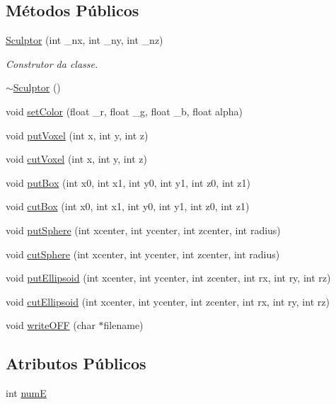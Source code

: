 \subsection*{Métodos Públicos}
\begin{DoxyCompactItemize}
\item 
\hyperlink{classSculptor_a014e3ef5517bf0e9d9e14486b6ac6433}{Sculptor} (int \+\_\+nx, int \+\_\+ny, int \+\_\+nz)
\begin{DoxyCompactList}\small\item\em Construtor da classe. \end{DoxyCompactList}\item 
\hyperlink{classSculptor_a8f159bf97458326f16d2e238e11be7ff}{$\sim$\+Sculptor} ()
\item 
void \hyperlink{classSculptor_a4e53f85ee03b729efafa985f72563c4b}{set\+Color} (float \+\_\+r, float \+\_\+g, float \+\_\+b, float alpha)
\item 
void \hyperlink{classSculptor_a4bdea3048b419d58e93074060eaa7b52}{put\+Voxel} (int x, int y, int z)
\item 
void \hyperlink{classSculptor_ad9d714a35fc8ae16d06eb5df37c3493c}{cut\+Voxel} (int x, int y, int z)
\item 
void \hyperlink{classSculptor_a311ad7a0fb83fc67ac1f378be8e99fe1}{put\+Box} (int x0, int x1, int y0, int y1, int z0, int z1)
\item 
void \hyperlink{classSculptor_aa84a1b12b09e9e103fc8d78f8d1bc00f}{cut\+Box} (int x0, int x1, int y0, int y1, int z0, int z1)
\item 
void \hyperlink{classSculptor_a794a2b6ee8fc8098fd6150cb46101fc6}{put\+Sphere} (int xcenter, int ycenter, int zcenter, int radius)
\item 
void \hyperlink{classSculptor_a67ab8c0ba5116adb8af1d01ad373ac15}{cut\+Sphere} (int xcenter, int ycenter, int zcenter, int radius)
\item 
void \hyperlink{classSculptor_a093615b0c2b9b3a17a56300b9b939f39}{put\+Ellipsoid} (int xcenter, int ycenter, int zcenter, int rx, int ry, int rz)
\item 
void \hyperlink{classSculptor_a18d2922c111c4c13653ee07d878151ad}{cut\+Ellipsoid} (int xcenter, int ycenter, int zcenter, int rx, int ry, int rz)
\item 
void \hyperlink{classSculptor_aa8ed61fc7cae10c4d7a895330fe5e309}{write\+O\+FF} (char $\ast$filename)
\end{DoxyCompactItemize}
\subsection*{Atributos Públicos}
\begin{DoxyCompactItemize}
\item 
int \hyperlink{classSculptor_a9ec05cea70fece563fa9fdea340696db}{numE}
\end{DoxyCompactItemize}
